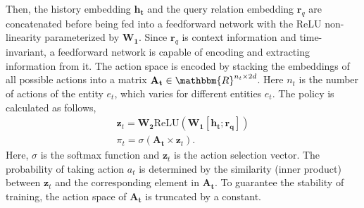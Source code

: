 \documentclass[lettersize,journal]{IEEEtran}
\begin{document}
Then, the history embedding $\mathbf{h_t}$ and the query relation embedding $\mathbf{r}_q$ are concatenated before being fed into a feedforward network with the ReLU non-linearity parameterized by $\mathbf{W_1}$. Since $\mathbf{r}_q$ is context information and time-invariant, a feedforward network is capable of encoding and extracting information from it. The action space is encoded by stacking the embeddings of all possible actions into a matrix $\mathbf{A_t}\in \mathbbm{R}^{n_t \times 2d}$. Here $n_t$ is the number of actions of the entity $e_t$, which varies for different entities $e_t$. The policy is calculated as follows,
\begin{align}
    \mathbf{z}_t= \mathbf{W_2}\mathrm{ReLU}(\mathbf{W_1}[\mathbf{h_t};\mathbf{r_q}])\\
    \pi_t=\sigma (\mathbf{A_t}\times \mathbf{z}_t).
\end{align}
Here, $\sigma$ is the softmax function and $\mathbf{z}_t$ is the action selection vector. The probability of taking action $a_t$ is determined by the similarity (inner product) between $\mathbf{z}_t$ and the corresponding element in $\mathbf{A_t}$. To guarantee the stability of training, the action space of $\mathbf{A_t}$ is truncated by a constant.
\end{document}
